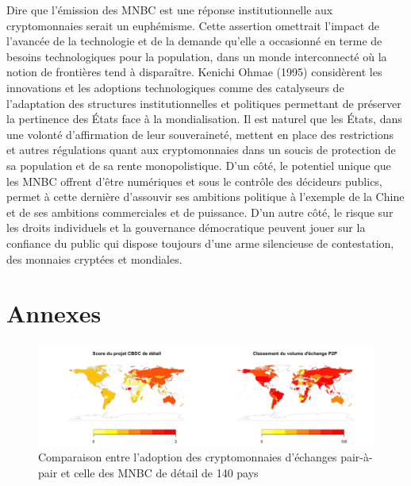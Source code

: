 \documentclass[12pt]{article}
\begin{document}
Dire que l'émission des MNBC est une réponse institutionnelle aux cryptomonnaies serait un euphémisme. Cette assertion omettrait l'impact de l'avancée de la technologie et de la demande qu'elle a occasionné en terme de besoins technologiques pour la population, dans un monde interconnecté où la notion de frontières tend à disparaître.  Kenichi Ohmae (1995) \cite{ohmae_end_2008} considèrent les innovations et les adoptions technologiques \cite{Davis1989PerceivedUP} comme des catalyseurs de l'adaptation des structures institutionnelles et politiques permettant de préserver la pertinence des États face à la mondialisation. Il est naturel que les États, dans une volonté d'affirmation de leur souveraineté, mettent en place des restrictions et autres régulations quant aux cryptomonnaies dans un soucis de protection de sa population et de sa rente monopolistique.
D'un côté, le potentiel unique que les MNBC offrent d'être numériques et sous le contrôle des décideurs publics, permet à cette dernière d'assouvir ses ambitions politique à l'exemple de la Chine et de ses ambitions commerciales et de puissance. D'un autre côté, le risque sur les droits individuels et la gouvernance démocratique peuvent jouer sur la confiance du public qui dispose toujours d'une arme silencieuse de contestation, des monnaies cryptées et mondiales.\\


\clearpage
\section{Annexes}
\FloatBarrier  %

\begin{figure}[htbp]
    \hspace{-4cm}
    \includegraphics[width=1.5\linewidth]{Carte du monde.png}
    \caption{Comparaison entre l'adoption des cryptomonnaies d'échanges pair-à-pair et celle des MNBC de détail de 140 pays}
    \label{fig:COMPA}
\end{figure}
\end{document}
